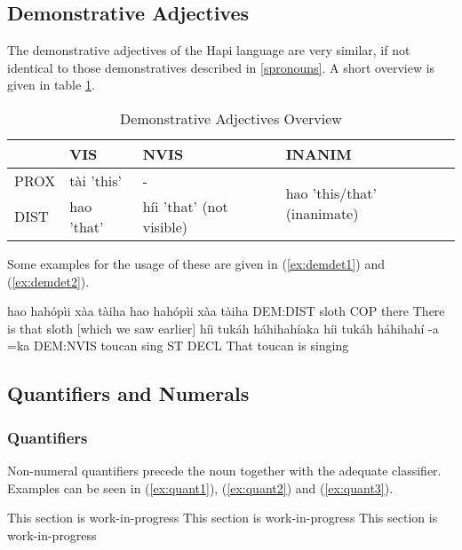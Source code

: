 \documentclass[a4paper, 12pt, oneside]{memoir}
\begin{document}
\subsection{Demonstrative Adjectives}\label{sdemonstrative}
The demonstrative adjectives of the Hapi language are very similar, if not identical to those demonstratives described in \ref{spronouns}. A short overview is given in table \ref{t:demdet}.
\begin{table}[H]
\centering
\begin{tabular}{@{}llll@{}}
\toprule
     & VIS        & NVIS                     & INANIM                                       \\ \midrule
PROX & tài 'this' & -                        & \multirow{2}{*}{hao 'this/that' (inanimate)} \\
DIST & hao 'that' & híi 'that' (not visible) &                                              \\ \bottomrule
\end{tabular}
\caption{Demonstrative Adjectives Overview}
\label{t:demdet}
\end{table}
Some examples for the usage of these are given in (\ref{ex:demdet1}) and (\ref{ex:demdet2}).
\begin{examples}
\ex \label{ex:demdet1}
\words hao hahópìi xàa tàiha
\bits hao hahópìi xàa tàiha
\gloss DEM:DIST sloth COP there
\tr There is that sloth [which we saw earlier]
\ex \label{ex:demdet2}
\words híi tukáh háhihahíaka
\bits híi tukáh háhihahí -a =ka 
\gloss DEM:NVIS toucan sing ST DECL
\tr That toucan is singing
\end{examples}
\subsection{Quantifiers and Numerals}\label{squantifier}
\subsubsection{Quantifiers}
Non-numeral quantifiers precede the noun together with the adequate classifier. Examples can be seen in (\ref{ex:quant1}), (\ref{ex:quant2}) and (\ref{ex:quant3}).
\begin{examples}
\ex \label{ex:quant1}
This section is work-in-progress
\ex \label{ex:quant2}
This section is work-in-progress
\ex \label{ex:quant3}
This section is work-in-progress
\end{examples}
\end{document}

